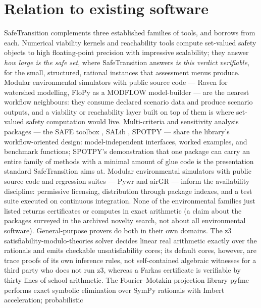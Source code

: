 \documentclass[3p,11pt]{elsarticle}
\begin{document}
\section{Relation to existing software}\label{sec:related}

SafeTransition complements three established families of tools, and borrows
from each. Numerical viability kernels and reachability tools compute
set-valued safety objects to high floating-point precision with
impressive scalability; they answer \emph{how large is the safe set},
where SafeTransition answers \emph{is this verdict verifiable}, for the
small, structured, rational instances that assessment menus produce.
Modular environmental simulators with public source code --- Raven
\citep{Craig2020} for watershed modelling, FloPy \citep{Bakker2016} as a
MODFLOW model-builder --- are the nearest workflow neighbours: they
consume declared scenario data and produce scenario outputs, and a
viability or reachability layer built on top of them is where set-valued
safety computation would live. Multi-criteria and sensitivity
analysis packages --- the SAFE toolbox \citep{Pianosi2015}, SALib
\citep{Herman2017}, SPOTPY \citep{Houska2015} --- share the library's
workflow-oriented design: model-independent interfaces, worked examples,
and benchmark functions; SPOTPY's demonstration that one package can carry
an entire family of methods with a minimal amount of glue code is the
presentation standard SafeTransition aims at. Modular environmental
simulators with public source code and regression suites --- Pywr
\citep{Tomlinson2020} and airGR \citep{Coron2017} --- inform the
availability discipline: permissive licensing, distribution through package
indexes, and a test suite executed on continuous integration. None of the environmental
families just listed returns certificates or computes in exact
arithmetic (a claim about the packages surveyed in the archived novelty
search, not about all environmental software). General-purpose
provers do both in their own domains. The z3
satisfiability-modulo-theories solver \citep{deMoura2008} decides linear
real arithmetic exactly over the rationals and emits checkable
unsatisfiability cores; its default cores, however, are trace proofs of
its own inference rules, not self-contained algebraic witnesses for a
third party who does not run z3, whereas a Farkas certificate is
verifiable by thirty lines of school arithmetic. The Fourier--Motzkin
projection library pyfme \citep{Caron2022} performs exact symbolic
elimination over SymPy rationals with Imbert acceleration; probabilistic
\end{document}
